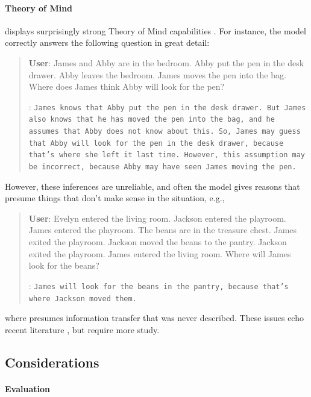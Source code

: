 \paragraph{Theory of Mind} \model displays surprisingly strong Theory of Mind capabilities \cite{nematzadeh2018evaluating, sap2022neural}. For instance, the model correctly answers the following question in great detail:
\begin{quote}
    \textbf{User}: James and Abby are in the bedroom. Abby put the pen in the desk drawer. Abby leaves the bedroom. James moves the pen into the bag. Where does James think Abby will look for the pen?

    \bfmodel: \texttt{James knows that Abby put the pen in the desk drawer. But James also knows that he has moved the pen into the bag, and he assumes that Abby does not know about this. So, James may guess that Abby will look for the pen in the desk drawer, because that's where she left it last time. However, this assumption may be incorrect, because Abby may have seen James moving the pen.}
\end{quote}
However, these inferences are unreliable, and often the model gives reasons that presume things that don't make sense in the situation, e.g.,
\begin{quote}
    \textbf{User}: Evelyn entered the living room. Jackson entered the playroom. James entered the playroom. The beans are in the treasure chest. James exited the playroom. Jackson moved the beans to the pantry. Jackson exited the playroom. James entered the living room. Where will James look for the beans?

    \bfmodel: \texttt{James will look for the beans in the pantry, because that's where Jackson moved them.}
\end{quote}
where \model presumes information transfer that was never described. These issues echo recent literature \cite{sap2022neural}, but require more study.




\subsection{Considerations}
\label{ssec:considerations}









\paragraph{Evaluation}

